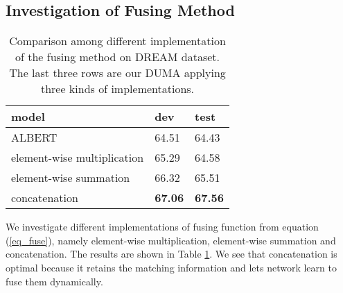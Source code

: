 \documentclass[letterpaper]{article} \usepackage{aaai21}  \usepackage{times}  \usepackage{helvet} \usepackage{courier}  \usepackage[hyphens]{url}  \usepackage{graphicx} \urlstyle{rm} \def\UrlFont{\rm}  \usepackage{natbib}  \usepackage{caption} \frenchspacing  \setlength{\pdfpagewidth}{8.5in}  \setlength{\pdfpageheight}{11in}
\begin{document}
\subsection{Investigation of Fusing Method} \label{fuse_investigate}

\begin{table}[t]\small
\renewcommand\arraystretch{1.3}
	\centering
	{
		\begin{tabular}{l|l|l}
			\hline		
			 model & dev & test  \\
			\hline
			\hline
			ALBERT & 64.51 & 64.43	 \\
			\hline
			element-wise multiplication & 65.29 &64.58\\
			element-wise summation & 66.32 & 65.51 \\
			concatenation & \textbf{67.06} & \textbf{67.56}\\
			\hline
		\end{tabular}
		
	}
	\caption{\label{fusing_methods} Comparison among different implementation of the fusing method on DREAM dataset. The last three rows are our DUMA applying three kinds of implementations.}
\end{table}


We investigate different implementations of fusing function from equation (\ref{eq_fuse}), namely element-wise multiplication, element-wise summation and concatenation. The results are shown in Table \ref{fusing_methods}. We see that concatenation is optimal because it retains the matching information and lets network learn to fuse them dynamically.
\end{document}
